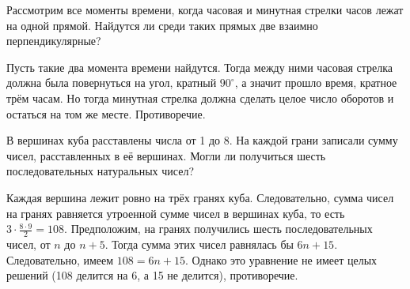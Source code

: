 \documentclass[a4paper,12pt]{article}
\begin{document}
    \problem Рассмотрим все моменты времени, когда часовая и минутная стрелки часов лежат на одной прямой. Найдутся ли среди таких прямых две взаимно перпендикулярные?
    \begin{solution}
        Пусть такие два момента времени найдутся. Тогда между ними часовая стрелка должна была повернуться на угол, кратный $90^{\circ}$, а значит прошло время, кратное трём часам. Но тогда минутная стрелка должна сделать целое число оборотов и остаться на том же месте. Противоречие.
    \end{solution}
    \problem В вершинах куба расставлены числа от 1 до 8. На каждой грани записали сумму чисел, расставленных в её вершинах. Могли ли получиться шесть последовательных натуральных чисел?
    \begin{solution}
        Каждая вершина лежит ровно на трёх гранях куба. Следовательно, сумма чисел на гранях равняется утроенной сумме чисел в вершинах куба, то есть $3 \cdot \frac{8 \cdot 9}{2} = 108$. Предположим, на гранях получились шесть последовательных чисел, от $n$ до $n + 5$. Тогда сумма этих чисел равнялась бы $6n + 15$. Следовательно, имеем $108 = 6n + 15$. Однако это уравнение не имеет целых решений (108 делится на 6, а 15 не делится), противоречие.
    \end{solution}
    
\end{document}
